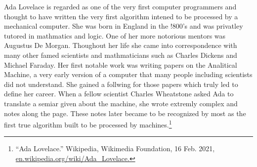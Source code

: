 \documentclass{article}
\begin{document}
Ada Lovelace is regarded as one of the very first computer programmers and thought to have written the very first algorithm intened to be processed by a mechanical computer. She was born in England in the !800's and was privatley tutored in mathmatics and logic. One of her more notorious mentors was Augustus De Morgan. Thoughout her life she came into correspondence with many other famed scientists and mathmaticians such as Charles Dickens and Michael Faraday. Her first notable work was writing papers on the Analitical Machine, a very early version of a computer that many people including scientists did not understand. She gained a follwing for those papers which truly led to define her career. When a fellow scientist Charles Wheatstone asked Ada to translate a semiar given about the machine, she wrote extremly complex and notes along the page. These notes later became to be recognized by most as the first true algorithm built to be processed by machines.\footnote{“Ada Lovelace.” Wikipedia, Wikimedia Foundation, 16 Feb. 2021, \url{en.wikipedia.org/wiki/Ada_Lovelace.}}
\end{document}
